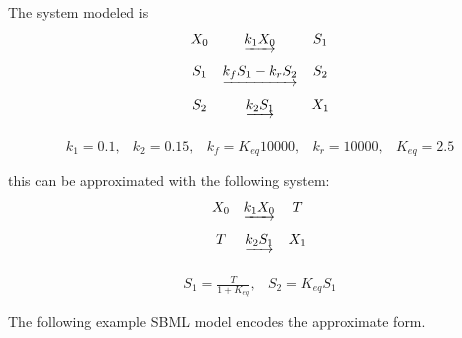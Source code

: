 \documentclass[10pt,twocolumntoc]{cekarticle}
\newcommand{\D}{\displaystyle}
\begin{document}
The system modeled is
\begin{equation*}
  \begin{array}{@{}ccc@{}}
    X_0 & \underrightarrow{k_1 X_0} & S_1 \\ \\[-4pt]
    S_1 & \underrightarrow{k_f S_1 - k_r S_2} & S_2 \\ \\[-4pt]
    S_2 & \underrightarrow{k_2 S_1} & X_1\\ \\[-4pt]
  \end{array}
\end{equation*}
\begin{equation*}
  \begin{array}{lllll}
    k_1 = 0.1, & k_2 = 0.15, & k_f = K_{eq} 10000, & k_r = 10000, & K_{eq} = 2.5\\ \\[-4pt]
  \end{array}
\end{equation*}
this can be approximated with the following system:
\begin{equation*}
  \begin{array}{@{}ccc@{}}
    X_0 & \underrightarrow{k_1 X_0} & T \\ \\[-4pt]
    T & \underrightarrow{k_2 S_1} & X_1\\ \\[-4pt]
  \end{array}
\end{equation*}
\begin{equation*}
  \begin{array}{ll}
    S_1 = \D\frac{T}{1 + K_{eq}}, & S_2 = K_{eq} S_1\\ \\[-4pt]
  \end{array}
\end{equation*}
The following example SBML model encodes the approximate form.
\end{document}
